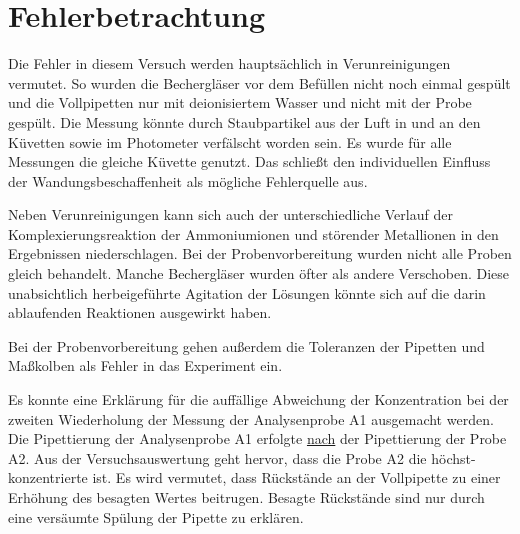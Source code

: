 \section{Fehlerbetrachtung}
\label{sec:fehler}

Die Fehler in diesem Versuch werden hauptsächlich in Verunreinigungen vermutet. So wurden die Bechergläser vor dem Befüllen nicht noch einmal gespült und die Vollpipetten nur mit deionisiertem Wasser und nicht mit der Probe gespült. Die Messung könnte durch Staubpartikel aus der Luft in und an den Küvetten sowie im Photometer verfälscht worden sein. Es wurde für alle Messungen die gleiche Küvette genutzt. Das schließt den individuellen Einfluss der Wandungsbeschaffenheit als mögliche Fehlerquelle aus. 

Neben Verunreinigungen kann sich auch der unterschiedliche Verlauf der Komplexierungsreaktion der Ammoniumionen und störender Metallionen in den Ergebnissen niederschlagen. Bei der Probenvorbereitung wurden nicht alle Proben gleich behandelt. Manche Bechergläser wurden öfter als andere Verschoben. Diese unabsichtlich herbeigeführte Agitation der Lösungen könnte sich auf die darin ablaufenden Reaktionen ausgewirkt haben. 

Bei der Probenvorbereitung gehen außerdem die Toleranzen der Pipetten und Maßkolben als Fehler in das Experiment ein. 

Es konnte eine Erklärung für die auffällige Abweichung der Konzentration bei der zweiten Wiederholung der Messung der Analysenprobe A1 ausgemacht werden. Die Pipettierung der Analysenprobe A1 erfolgte \underline{nach} der Pipettierung der Probe A2. Aus der Versuchsauswertung geht hervor, dass die Probe A2 die höchst-konzentrierte ist. Es wird vermutet, dass Rückstände an der Vollpipette zu einer Erhöhung des besagten Wertes beitrugen. Besagte Rückstände sind nur durch eine versäumte Spülung der Pipette zu erklären.
